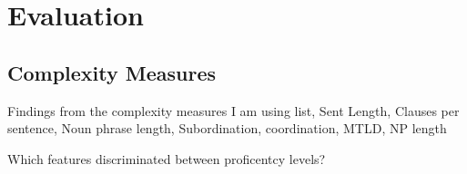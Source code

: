 \chapter{Evaluation} 

\section{Complexity Measures}
Findings from the complexity measures I am using 
list, Sent Length, Clauses per sentence, Noun phrase length,  Subordination, coordination, MTLD, NP length

Which features discriminated between proficentcy levels?

